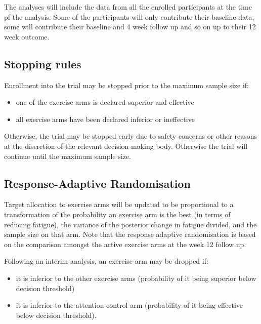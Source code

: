 \documentclass[
]{article}
\providecommand{\tightlist}{%
  \setlength{\itemsep}{0pt}\setlength{\parskip}{0pt}}
\begin{document}
The analyses will include the data from all the enrolled participants at the time pf the analysis.
Some of the participants will only contribute their baseline data, some will contribute their baseline and 4 week follow up and so on up to their 12 week outcome.

\hypertarget{stopping-rules}{%
  \subsection{Stopping rules}\label{stopping-rules}}

Enrollment into the trial may be stopped prior to the maximum sample size if:

\begin{itemize}\tightlist
  \item one of the exercise arms is declared superior and effective
  \item all exercise arms have been declared inferior or ineffective
\end{itemize}

Otherwise, the trial may be stopped early due to safety concerns or other reasons at the discretion of the relevant decision making body.
Otherwise the trial will continue until the maximum sample size.

\hypertarget{response-adaptive-randomisation}{%
  \subsection{Response-Adaptive Randomisation}\label{response-adaptive-randomisation}}

Target allocation to exercise arms will be updated to be proportional to a transformation of the probability an exercise arm is the best (in terms of reducing fatigue), the variance of the posterior change in fatigue divided, and the sample size on that arm.
Note that the response adaptive randomisation is based on the comparison amongst the active exercise arms at the week 12 follow up.

Following an interim analysis, an exercise arm may be dropped if:
\begin{itemize}\tightlist
  \item it is inferior to the other exercise arms (probability of it being superior below decision threshold)
  \item it is inferior to the attention-control arm (probability of it being effective below decision threshold).
\end{itemize}
\end{document}
